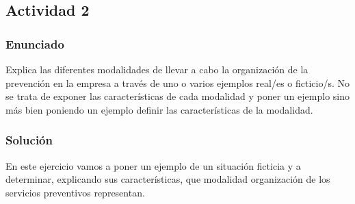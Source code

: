 \subsection{Actividad 2}

\subsubsection{Enunciado}
Explica las diferentes modalidades de llevar a cabo la organización de la prevención en la empresa a través de uno o varios ejemplos real/es o ficticio/s. No se trata de exponer las características de cada modalidad y poner un ejemplo sino más bien poniendo un ejemplo definir las características de la modalidad.

\subsubsection{Solución}
En este ejercicio vamos a poner un ejemplo de un situación ficticia y a determinar, explicando sus características, que modalidad organización de los servicios preventivos representan.

